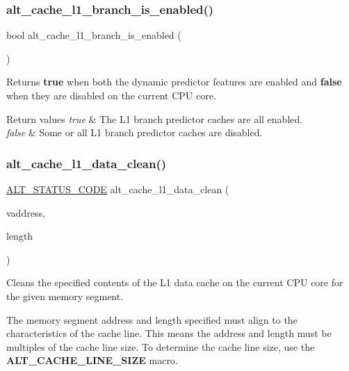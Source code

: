 \subsubsection{\texorpdfstring{alt\_cache\_l1\_branch\_is\_enabled()}{alt\_cache\_l1\_branch\_is\_enabled()}}
{\footnotesize\ttfamily bool alt\+\_\+cache\+\_\+l1\+\_\+branch\+\_\+is\+\_\+enabled (\begin{DoxyParamCaption}\item[{void}]{ }\end{DoxyParamCaption})}

Returns {\bfseries{true}} when both the dynamic predictor features are enabled and {\bfseries{false}} when they are disabled on the current C\+PU core.


\begin{DoxyRetVals}{Return values}
{\em true} & The L1 branch predictor caches are all enabled. \\
\hline
{\em false} & Some or all L1 branch predictor caches are disabled. \\
\hline
\end{DoxyRetVals}
\mbox{\label{group__CACHE__L1_gaada93137c48ec5389a2440f051db1614}} 
\subsubsection{\texorpdfstring{alt\_cache\_l1\_data\_clean()}{alt\_cache\_l1\_data\_clean()}}
{\footnotesize\ttfamily \mbox{\hyperlink{hwlib_8h_abdb0d369f069723ca55d6c94bcaaaa12}{A\+L\+T\+\_\+\+S\+T\+A\+T\+U\+S\+\_\+\+C\+O\+DE}} alt\+\_\+cache\+\_\+l1\+\_\+data\+\_\+clean (\begin{DoxyParamCaption}\item[{void $\ast$}]{vaddress,  }\item[{size\+\_\+t}]{length }\end{DoxyParamCaption})}

Cleans the specified contents of the L1 data cache on the current C\+PU core for the given memory segment.

The memory segment address and length specified must align to the characteristics of the cache line. This means the address and length must be multiples of the cache line size. To determine the cache line size, use the {\bfseries{A\+L\+T\+\_\+\+C\+A\+C\+H\+E\+\_\+\+L\+I\+N\+E\+\_\+\+S\+I\+ZE}} macro.


